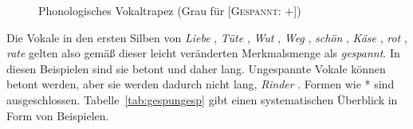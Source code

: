 \begin{figure}[!htpb]
  \caption[Phonologisches Vokaltrapez]{Phonologisches Vokaltrapez (Grau für [\textsc{Gespannt}: $+$])}
  \label{fig:vokalviereckmitgespannt}
\end{figure}

Die Vokale in den ersten Silben von \textit{Liebe} \textipa{[li:b@]}, \textit{Tüte} \textipa{[ty:t@]}, \textit{Wut} \textipa{[vu:t]}, \textit{Weg} \textipa{[ve:k]}, \textit{schön} \textipa{[S\o:n]}, \textit{Käse} \textipa{[kE:z@]}, \textit{rot} \textipa{[Ko:t]}, \textit{rate} \textipa{[Ka:t@]} gelten also gemäß dieser leicht veränderten Merkmalsmenge als \textit{gespannt}.
In diesen Beispielen sind sie betont und daher lang.
Ungespannte Vokale können betont werden, aber sie werden dadurch nicht lang, \zB \textit{Rinder} \textipa{[KInd5]}.
Formen wie *\textipa{[KI:nd5]} sind ausgeschlossen.
Tabelle~\ref{tab:gespungesp} gibt einen systematischen Überblick in Form von Beispielen.

